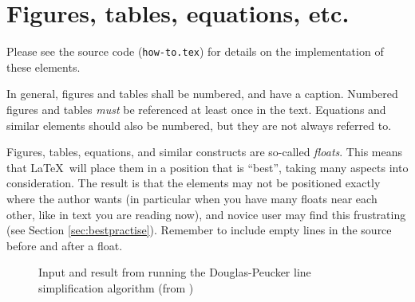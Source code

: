 \lipsum[17-18]

\section{Figures, tables, equations, etc.}

Please see the source code (\texttt{how-to.tex}) for details on the implementation of these elements.

In general, figures and tables shall be numbered, and have a caption. Numbered figures and tables {\em must} be referenced at least once in the text. Equations and similar elements should also be numbered, but they are not always referred to.

Figures, tables, equations, and similar constructs are so-called {\em floats}. This means that \LaTeX\ will place them in a position that is ``best'', taking many aspects into consideration. The result is that the elements may not be positioned exactly where the author wants (in particular when you have many floats near each other, like in text you are reading now), and novice user may find this frustrating (see Section \ref{sec:bestpractise}). Remember to include empty lines in the source before and after a float.

\begin{figure}[!htbp]
  \begin{center}
  \end{center}
  \caption{Input and result from running the Douglas-Peucker line simplification algorithm (from  \parencite{kjeldsen05cor})}
  \label{fig:dpaustralia}
\end{figure}

